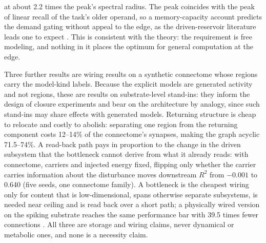 \documentclass[12pt]{article}
\begin{document}
at about 2.2 times the peak's spectral radius. The peak coincides with the peak of linear recall of the task's older operand, so a memory-capacity account predicts the demand gating without appeal to the edge, as the driven-reservoir literature leads one to expect \citep{Schuecker2018,HarunaNakajima2019}. This is consistent with the theory: the requirement is free modeling, and nothing in it places the optimum for general computation at the edge.

Three further results \citep[\S5]{Gruber2026d} are wiring results on a synthetic connectome whose regions carry the model-kind labels. Because the explicit models are generated activity and not regions, these are results on substrate-level stand-ins: they inform the design of closure experiments and bear on the architecture by analogy, since such stand-ins may share effects with generated models. Returning structure is cheap to relocate and costly to abolish: separating one region from the returning component costs 12--14\% of the connectome's synapses, making the graph acyclic 71.5--74\%. A read-back path pays in proportion to the change in the driven subsystem that the bottleneck cannot derive from what it already reads: with connectome, carriers and injected energy fixed, flipping only whether the carrier carries information about the disturbance moves downstream $R^2$ from $-0.001$ to 0.640 (five seeds, one connectome family). A bottleneck is the cheapest wiring only for content that is low-dimensional, spans otherwise separate subsystems, is needed near ceiling and is read back over a short path; a physically wired version on the spiking substrate reaches the same performance bar with 39.5 times fewer connections \citep[\S8]{Gruber2026d}. All three are storage and wiring claims, never dynamical or metabolic ones, and none is a necessity claim.
\end{document}
